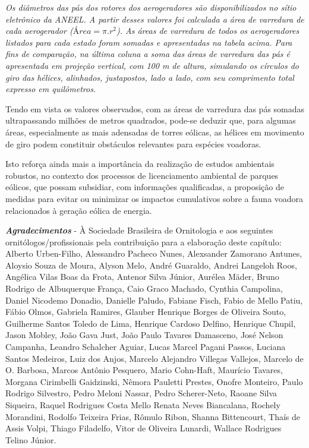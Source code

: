 \documentclass[
  oneside]{scrbook}
\begin{document}
\emph{Os diâmetros das pás dos rotores dos aerogeradores são disponibilizados no sítio eletrônico da ANEEL. A partir desses valores foi calculada a área de varredura de cada aerogerador (\(Área = \pi.r^2\)). As áreas de varredura de todos os aerogeradores listados para cada estado foram somadas e apresentadas na tabela acima. Para fins de comparação, na última coluna a soma das áreas de varredura das pás é apresentada em projeção vertical, com 100 m de altura, simulando os círculos do giro das hélices, alinhados, justapostos, lado a lado, com seu comprimento total expresso em quilômetros.}

\begin{blackbox}
Tendo em vista os valores observados, com as áreas de varredura das pás somadas ultrapassando milhões de metros quadrados, pode-se deduzir que, para algumas áreas, especialmente as mais adensadas de torres eólicas, as hélices em movimento de giro podem constituir obstáculos relevantes para espécies voadoras.

Isto reforça ainda mais a importância da realização de estudos ambientais robustos, no contexto dos processos de licenciamento ambiental de parques eólicos, que possam subsidiar, com informações qualificadas, a proposição de medidas para evitar ou minimizar os impactos cumulativos sobre a fauna voadora relacionados à geração eólica de energia.

\end{blackbox}

\newpage

\textbf{\emph{Agradecimentos}} - À Sociedade Brasileira de Ornitologia e aos seguintes ornitólogos/profissionais pela contribuição para a elaboração deste capítulo:
Alberto Urben-Filho,
Alessandro Pacheco Nunes,
Alexsander Zamorano Antunes,
Aloysio Souza de Moura,
Alyson Melo,
André Guaraldo,
Andrei Langeloh Roos,
Angélica Vilas Boas da Frota,
Antenor Silva Júnior,
Aurélea Mäder,
Bruno Rodrigo de Albuquerque França,
Caio Graco Machado,
Cynthia Campolina,
Daniel Nicodemo Donadio,
Danielle Paludo,
Fabiane Fisch,
Fabio de Mello Patiu,
Fábio Olmos,
Gabriela Ramires,
Glauber Henrique Borges de Oliveira Souto,
Guilherme Santos Toledo de Lima,
Henrique Cardoso Delfino,
Henrique Chupil,
Jason Mobley,
João Gava Just,
João Paulo Tavares Damasceno,
José Nelson Campanha,
Leandro Schalcher Aguiar,
Lucas Marcel Pagani Passos,
Luciana Santos Medeiros,
Luiz dos Anjos,
Marcelo Alejandro Villegas Vallejos,
Marcelo de O. Barbosa,
Marcos Antônio Pesquero,
Mario Cohn-Haft,
Maurício Tavares,
Morgana Cirimbelli Gaidzinski,
Nêmora Pauletti Prestes,
Onofre Monteiro,
Paulo Rodrigo Silvestro,
Pedro Meloni Nassar,
Pedro Scherer-Neto,
Raoane Silva Siqueira,
Raquel Rodrigues Costa Mello
Renata Neves Biancalana,
Rochely Morandini,
Rodolfo Teixeira Frias,
Rômulo Ribon,
Shanna Bittencourt,
Thaís de Assis Volpi,
Thiago Filadelfo,
Vitor de Oliveira Lunardi,
Wallace Rodrigues Telino Júnior.
\end{document}
